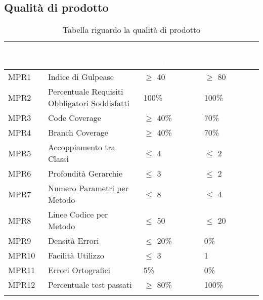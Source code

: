 \subsection{Qualità di prodotto}
{

    \setlength{\freewidth}{\dimexpr\textwidth-10\tabcolsep}
    \renewcommand{\arraystretch}{1.5}
    \centering
    \setlength{\aboverulesep}{0pt}
    \setlength{\belowrulesep}{0pt}
    \begin{longtable}{C{.257\freewidth} C{.257\freewidth} C{.257\freewidth} C{.257\freewidth}}
       \toprule
    \textcolor{white}{\textbf{Metrica}}&
    \textcolor{white}{\textbf{Nome}}&
    \textcolor{white}{\textbf{Valore accettabile}}&
    \textcolor{white}{\textbf{Valore preferibile}}\\	
    \toprule
    \endhead
    
    
    MPR1 & Indice di Gulpease & $\geq$ 40 & $\geq$ 80 \\
    MPR2 & Percentuale Requisiti Obbligatori Soddisfatti & 100\% & 100\% \\
    MPR3 & Code Coverage & $\geq$ 40\% & 70\% \\
    MPR4 & Branch Coverage & $\geq$ 40\% & 70\% \\
    MPR5 & Accoppiamento tra Classi & $\leq$ 4 & $\leq$ 2 \\
    MPR6 & Profondità Gerarchie & $\leq$ 3 & $\leq$ 2 \\
    MPR7 & Numero Parametri per Metodo & $\leq$ 8 & $\leq$ 4 \\
    MPR8 & Linee Codice per Metodo & $\leq$ 50 & $\leq$ 20 \\
    MPR9 & Densità Errori & $\leq$ 20\% & 0\% \\
    MPR10 & Facilità Utilizzo  & $\leq$ 3 & 1 \\
    MPR11 & Errori Ortografici & 5\% & 0\% \\
    MPR12 & Percentuale test passati & $\geq$ 80\% & 100\% \\	   
    \bottomrule
    \caption{Tabella riguardo la qualità di prodotto}
    \end{longtable}
}
